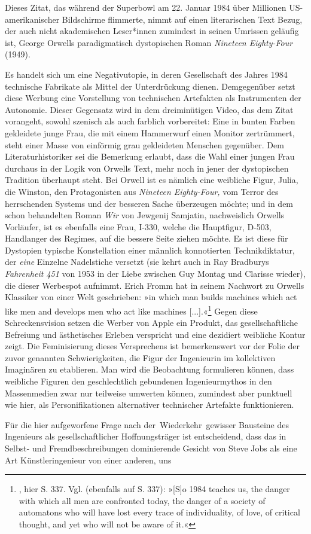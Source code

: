 \documentclass[%
	fontsize=10pt,%
	twoside,%
	headings=optiontoheadandtoc,%
	showtrims]{scrbook}
\renewcommand{\texttt}{\nohyphens} %
\begin{document}
\par Dieses Zitat, das während der Superbowl am 22. Januar 1984 über Millionen US-amerikanischer Bildschirme flimmerte, nimmt auf einen literarischen Text Bezug, der auch nicht akademischen Leser*innen zumindest in seinen Umrissen geläufig ist, George Orwells paradigmatisch dystopischen Roman \emph{Nineteen Eighty-Four} (1949).\par Es handelt sich um eine Negativutopie, in deren Gesellschaft des Jahres 1984 technische Fabrikate als Mittel der Unterdrückung dienen. Demgegenüber setzt diese Werbung eine Vorstellung von technischen Artefakten als Instrumenten der Autonomie. Dieser Gegensatz wird in dem dreiminütigen Video, das dem Zitat vorangeht, sowohl szenisch als auch farblich vorbereitet: Eine in bunten Farben gekleidete junge Frau, die mit einem Hammerwurf einen Monitor zertrümmert, steht einer Masse von einförmig grau gekleideten Menschen gegenüber. Dem Literaturhistoriker sei die Bemerkung erlaubt, dass die Wahl einer jungen Frau durchaus in der Logik von Orwells Text, mehr noch in jener der dystopischen Tradition überhaupt steht. Bei Orwell ist es nämlich eine weibliche Figur, Julia, die Winston, den Protagonisten aus \emph{Nineteen Eighty-Four,} vom Terror des herrschenden Systems und der besseren Sache überzeugen möchte; und in dem schon behandelten Roman \emph{Wir} von Jewgenij Samjatin, nachweislich Orwells Vorläufer, ist es ebenfalls eine Frau, I-330, welche die Hauptfigur, D-503, Handlanger des Regimes, auf die bessere Seite ziehen möchte. Es ist diese für Dystopien typische Konstellation einer männlich konnotierten Technikdiktatur, der \emph{eine} Einzelne Nadelstiche versetzt (sie kehrt auch in Ray Bradburys \emph{Fahrenheit 451} von 1953 in der Liebe zwischen Guy Montag und Clarisse wieder), die dieser Werbespot aufnimmt. Erich Fromm hat in seinem Nachwort zu Orwells Klassiker von einer Welt geschrieben: »in which man builds machines which act like men and develops men who act like machines {[}...{]}.«\footnote{\cite[][]{fromm2003a}, hier S. 337. Vgl. (ebenfalls auf S. 337): »{[}S{]}o 1984 teaches us, the danger with which all men are confronted today, the danger of a society of automatons who will have lost every trace of individuality, of love, of critical thought, and yet who will not be aware of it.«}  Gegen diese Schreckensvision setzen die Werber von Apple ein Produkt, das gesellschaftliche Befreiung und ästhetisches Erleben verspricht und eine dezidiert weibliche Kontur zeigt. Die Feminisierung dieses Versprechens ist bemerkenswert vor der Folie der zuvor genannten Schwierigkeiten, die Figur der Ingenieurin im kollektiven Imaginären zu etablieren. Man wird die Beobachtung formulieren können, dass weibliche Figuren den geschlechtlich gebundenen Ingenieurmythos in den Massenmedien zwar nur teilweise umwerten können, zumindest aber punktuell wie hier, als Personifikationen alternativer technischer Artefakte funktionieren.\par Für die hier aufgeworfene Frage nach \texttt{der~Wiederkehr}~\texttt{ge\-wisser} Bausteine des Ingenieurs als \texttt{gesellschaftlicher} Hoff\-nungs\-träger ist entscheidend, dass das in Selbst- und Fremdbeschreibungen dominierende Gesicht von Steve Jobs als eine Art Künstleringenieur von einer anderen, uns 
\end{document}
